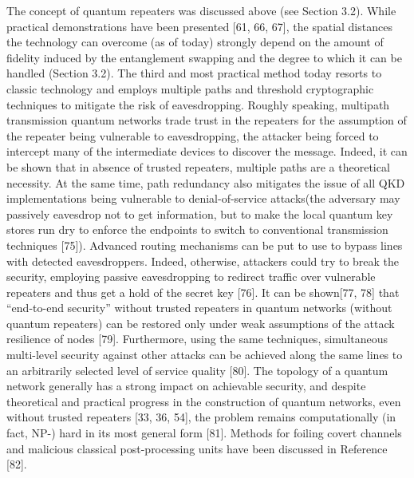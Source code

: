 The concept of quantum repeaters was discussed above (see Section 3.2). While practical demonstrations have been presented [61, 66, 67], the spatial distances the technology can overcome (as of today) strongly depend on the amount of fidelity induced by the entanglement swapping and the degree to which it can be handled (Section 3.2).
The third and most practical method today resorts to classic technology and employs multiple paths and threshold cryptographic techniques to mitigate the risk of eavesdropping. Roughly speaking, multipath transmission quantum networks trade trust in the repeaters for the assumption of the repeater being vulnerable to eavesdropping, the attacker being forced to intercept many of the intermediate devices to discover the message. Indeed, it can be shown that in absence of trusted repeaters, multiple paths are a theoretical necessity. At the same time, path redundancy also mitigates the issue of all QKD implementations being vulnerable to denial-of-service attacks(the adversary may passively eavesdrop not to get information, but to make the local quantum key stores run dry to enforce the endpoints to switch to conventional transmission techniques [75]).
Advanced routing mechanisms can be put to use to bypass lines with detected eavesdroppers.
Indeed, otherwise, attackers could try to break the security, employing passive eavesdropping to redirect traffic over vulnerable repeaters and thus get a hold of the secret key [76]. It can be shown[77, 78] that “end-to-end security” without trusted repeaters in quantum networks (without quantum repeaters) can be restored only under weak assumptions of the attack resilience of nodes [79].
Furthermore, using the same techniques, simultaneous multi-level security against other attacks can be achieved along the same lines to an arbitrarily selected level of service quality [80]. The topology of a quantum network generally has a strong impact on achievable security, and despite theoretical and practical progress in the construction of quantum networks, even without trusted repeaters [33, 36, 54], the problem remains computationally (in fact, NP-) hard in its most general form [81]. Methods for foiling covert channels and malicious classical post-processing units have been discussed in Reference [82].
